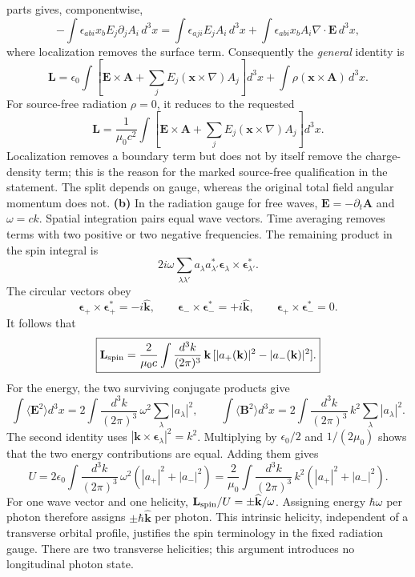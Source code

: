 parts gives, componentwise,
\[
-\int\epsilon_{abi}x_bE_j\partial_jA_i\,d^3x
=\int\epsilon_{aji}E_jA_i\,d^3x
+\int\epsilon_{abi}x_bA_i\nabla\cdot\mathbf E\,d^3x,
\]
where localization removes the surface term. Consequently the
\emph{general} identity is
\[
\mathbf L=\epsilon_0\int\left[
\mathbf E\times\mathbf A+\sum_j E_j(\mathbf x\times\nabla)A_j
\right]d^3x+\int\rho(\mathbf x\times\mathbf A)\,d^3x.
\]
For source-free radiation $\rho=0$, it reduces to the requested
\[
\boxed{\mathbf L=\frac1{\mu_0c^2}\int\left[
\mathbf E\times\mathbf A+\sum_j E_j(\mathbf x\times\nabla)A_j
\right]d^3x.}
\]
Localization removes a boundary term but does not by itself remove
the charge-density term; this is the reason for the marked
source-free qualification in the statement. The split depends on
gauge, whereas the original total field angular momentum does not.
\textbf{(b)} In the radiation gauge for free waves,
$\mathbf E=-\partial_t\mathbf A$ and $\omega=ck$.
Spatial integration pairs equal wave vectors. Time averaging
removes terms with two positive or two negative frequencies. The
remaining product in the spin integral is
\[
2i\omega\sum_{\lambda\lambda'}a_\lambda a_{\lambda'}^*
\boldsymbol\epsilon_\lambda\times
\boldsymbol\epsilon_{\lambda'}^*.
\]
The circular vectors obey
\[
\boldsymbol\epsilon_+\times\boldsymbol\epsilon_+^*
=-i\widehat{\mathbf k},\qquad
\boldsymbol\epsilon_-\times\boldsymbol\epsilon_-^*
=+i\widehat{\mathbf k},\qquad
\boldsymbol\epsilon_+\times\boldsymbol\epsilon_-^*=0.
\]
It follows that
\[
\boxed{\mathbf L_{\rm spin}=\frac2{\mu_0c}
\int\frac{d^3k}{(2\pi)^3}\,
\mathbf k\,[|a_+(\mathbf k)|^2-|a_-(\mathbf k)|^2].}
\]
For the energy, the two surviving conjugate products give
\[
\int\langle\mathbf E^2\rangle d^3x
=2\int\frac{d^3k}{(2\pi)^3}\,\omega^2
\sum_\lambda|a_\lambda|^2,\qquad
\int\langle\mathbf B^2\rangle d^3x
=2\int\frac{d^3k}{(2\pi)^3}\,k^2
\sum_\lambda|a_\lambda|^2.
\]
The second identity uses $|\mathbf k\times\boldsymbol\epsilon_\lambda|^2=k^2$.
Multiplying by $\epsilon_0/2$ and $1/(2\mu_0)$ shows that the two
energy contributions are equal. Adding them gives
\[
\boxed{U=2\epsilon_0\int\frac{d^3k}{(2\pi)^3}\,
\omega^2(|a_+|^2+|a_-|^2)
=\frac2{\mu_0}\int\frac{d^3k}{(2\pi)^3}\,
 k^2(|a_+|^2+|a_-|^2).}
\]
For one wave vector and one helicity,
$\mathbf L_{\rm spin}/U=\pm\widehat{\mathbf k}/\omega$.
Assigning energy $\hbar\omega$ per photon therefore assigns
$\pm\hbar\widehat{\mathbf k}$ per photon. This intrinsic helicity,
independent of a transverse orbital profile, justifies the spin
terminology in the fixed radiation gauge. There are two transverse
helicities; this argument introduces no longitudinal photon state.

